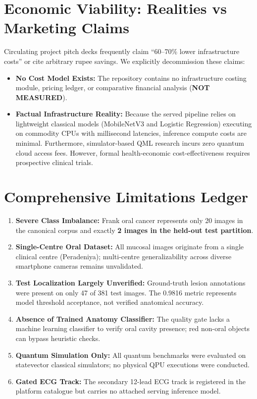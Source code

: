 \documentclass[11pt,a4paper]{report}
\newcommand{\notmeasured}{\textcolor{csred}{\textbf{NOT MEASURED}}}
\begin{document}
\section{Economic Viability: Realities vs Marketing Claims}
Circulating project pitch decks frequently claim ``60--70\% lower infrastructure costs'' or cite arbitrary rupee savings. We explicitly decommission these claims:
\begin{itemize}
  \item \textbf{No Cost Model Exists:} The repository contains no infrastructure costing module, pricing ledger, or comparative financial analysis (\notmeasured).
  \item \textbf{Factual Infrastructure Reality:} Because the served pipeline relies on lightweight classical models (MobileNetV3 and Logistic Regression) executing on commodity CPUs with millisecond latencies, inference compute costs are minimal. Furthermore, simulator-based QML research incurs zero quantum cloud access fees. However, formal health-economic cost-effectiveness requires prospective clinical trials.
\end{itemize}

\section{Comprehensive Limitations Ledger}
\begin{enumerate}
  \item \textbf{Severe Class Imbalance:} Frank oral cancer represents only 20 images in the canonical corpus and exactly \textbf{2 images in the held-out test partition}.
  \item \textbf{Single-Centre Oral Dataset:} All mucosal images originate from a single clinical centre (Peradeniya); multi-centre generalizability across diverse smartphone cameras remains unvalidated.
  \item \textbf{Test Localization Largely Unverified:} Ground-truth lesion annotations were present on only 47 of 381 test images. The 0.9816 metric represents model threshold acceptance, not verified anatomical accuracy.
  \item \textbf{Absence of Trained Anatomy Classifier:} The quality gate lacks a machine learning classifier to verify oral cavity presence; red non-oral objects can bypass heuristic checks.
  \item \textbf{Quantum Simulation Only:} All quantum benchmarks were evaluated on statevector classical simulators; no physical QPU executions were conducted.
  \item \textbf{Gated ECG Track:} The secondary 12-lead ECG track is registered in the platform catalogue but carries no attached serving inference model.
\end{enumerate}
\end{document}
